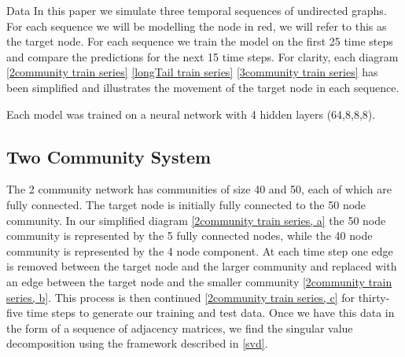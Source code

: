 \documentclass[12pt]{amsart}
\begin{document}
\begin{section}{Data}
    In this paper we simulate three temporal sequences of undirected graphs. For each sequence we will be modelling the node in red, we will refer to this as the target node. For each sequence we train the model on the first 25 time steps and compare the predictions for the next 15 time steps. For clarity, each diagram \autoref{2community train series} \autoref{longTail train series} \autoref{3community train series} has been simplified and illustrates the movement of the target node in each sequence.

    Each model was trained on a neural network with 4 hidden layers (64,8,8,8).

    \subsection{Two Community System}
        The 2 community network has communities of size 40 and 50, each of which are fully connected. The target node is initially fully connected to the 50 node community. In our simplified diagram \autoref{2community train series, a} the 50 node community is represented by the 5 fully connected nodes, while the 40 node community is represented by the 4 node component. At each time step one edge is removed between the target node and the larger community and replaced with an edge between the target node and the smaller community \autoref{2community train series, b}. This process is then continued \autoref{2community train series, c} for thirty-five time steps to generate our training and test data. Once we have this data in the form of a sequence of adjacency matrices, we find the singular value decomposition using the framework described in \autoref{svd}.


\end{section}
\end{document}
